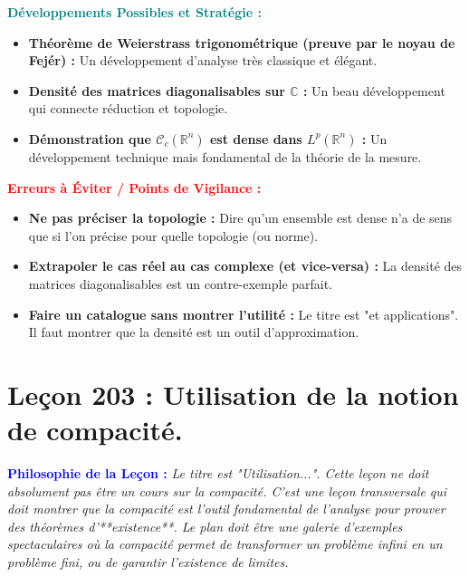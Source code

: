 \documentclass[12pt, a4paper, parskip=full]{report}
\theoremstyle{agregstyle}
\newenvironment{philosophie}
  {\par\medskip\noindent\begin{oframed}\noindent\textbf{\textcolor{blue}{Philosophie de la Leçon :}}\itshape}
  {\end{oframed}\par\medskip}
\newenvironment{developpements}
  {\par\medskip\noindent\begin{oframed}\noindent\textbf{\textcolor{teal}{Développements Possibles et Stratégie :}}}
  {\end{oframed}\par\medskip}
\newenvironment{erreurs}
  {\par\medskip\noindent\begin{oframed}\noindent\textbf{\textcolor{red}{Erreurs à Éviter / Points de Vigilance :}}}
  {\end{oframed}\par\medskip}
\begin{document}
\begin{developpements}
    \begin{itemize}
        \item \textbf{Théorème de Weierstrass trigonométrique (preuve par le noyau de Fejér) :} Un développement d'analyse très classique et élégant.
        \item \textbf{Densité des matrices diagonalisables sur $\mathbb{C}$ :} Un beau développement qui connecte réduction et topologie.
        \item \textbf{Démonstration que $\mathcal{C}_c(\mathbb{R}^n)$ est dense dans $L^p(\mathbb{R}^n)$ :} Un développement technique mais fondamental de la théorie de la mesure.
    \end{itemize}
\end{developpements}

\begin{erreurs}
    \begin{itemize}
        \item \textbf{Ne pas préciser la topologie :} Dire qu'un ensemble est dense n'a de sens que si l'on précise pour quelle topologie (ou norme).
        \item \textbf{Extrapoler le cas réel au cas complexe (et vice-versa) :} La densité des matrices diagonalisables est un contre-exemple parfait.
        \item \textbf{Faire un catalogue sans montrer l'utilité :} Le titre est "et applications". Il faut montrer que la densité est un outil d'approximation.
    \end{itemize}
\end{erreurs}
\chapter{Leçon 203 : Utilisation de la notion de compacité.}

\begin{philosophie}
    Le titre est "Utilisation...". Cette leçon ne doit absolument pas être un cours sur la compacité. C'est une leçon transversale qui doit montrer que la compacité est l'outil fondamental de l'analyse pour prouver des théorèmes d'**existence**. Le plan doit être une galerie d'exemples spectaculaires où la compacité permet de transformer un problème infini en un problème fini, ou de garantir l'existence de limites.
\end{philosophie}
\end{document}
